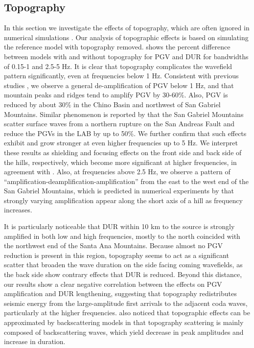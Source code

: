 \subsection{Topography}
In this section we investigate the effects of topography, which are often ignored in numerical simulations . Our analysis of topographic effects is based on simulating the reference model with topography removed.
 shows the percent difference between models with and without topography for PGV and DUR for bandwidths of 0.15-1 and 2.5-5 Hz. It is clear that topography complicates the wavefield pattern significantly, even at frequencies below 1 Hz. Consistent with previous studies , we observe a general de-amplification of PGV below 1 Hz, and that mountain peaks and ridges tend to amplify PGV by 30-60\%. Also, PGV is reduced by about 30\% in the Chino Basin and northwest of San Gabriel Mountains. Similar phenomenon is reported by \citet{maEffectsLargeScaleSurface2007} that the San Gabriel Mountains scatter surface waves from a northern rupture on the San Andreas Fault and reduce the PGVs in the LAB by up to 50\%. We further confirm that such effects exhibit and grow stronger at even higher frequencies up to 5 Hz. We interpret these results as shielding and focusing effects on the front side and back side of the hills, respectively, which become more significant at higher frequencies, in agreement with \citet{liuScatteringSeismicWaves2020}. Also, at frequencies above 2.5 Hz, we observe a pattern of “amplification-deamplification-amplification” from the east to the west end of the San Gabriel Mountains, which is predicted in numerical experiments by \citet{liuScatteringSeismicWaves2020} that strongly varying amplification appear along the short axis of a hill as frequency increases.

It is particularly noticeable that DUR within 10 km to the source is strongly amplified in both low and high frequencies, mostly to the north coincided with the northwest end of the Santa Ana Mountains. Because almost no PGV reduction is present in this region, topography seems to act as a significant scatter that broaden the wave duration on the side facing coming wavefields, as the back side show contrary effects that DUR is reduced. Beyond this distance, our results show a clear negative correlation between the effects on PGV amplification and DUR lengthening, suggesting that topography redistributes seismic energy from the large-amplitude first arrivals to the adjacent coda waves, particularly at the higher frequencies. \citet{imperatoriRoleTopographyLateral2015} also noticed that topographic effects can be approximated by backscattering models in that topography scattering is mainly composed of backscattering waves, which yield decrease in peak amplitudes and increase in duration.

